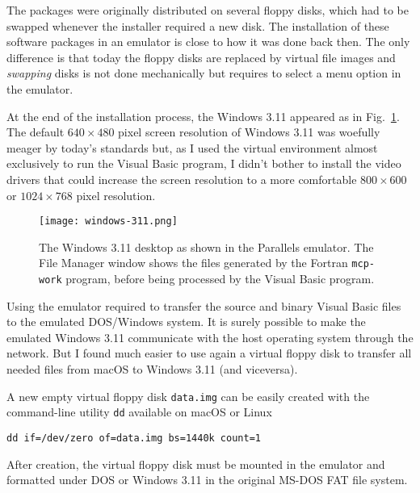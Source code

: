 The packages were originally distributed on several floppy disks, which had to be swapped whenever the installer required a new disk. 
The installation of these software packages in an emulator is close to how it was done back then.
The only difference is that today the floppy disks are replaced by virtual file images and \emph{swapping} disks is not done mechanically but requires to select a menu option in the emulator.

At the end of the installation process, the Windows 3.11 appeared as in Fig.~\ref{fig:windows-311}.
The default $640 \times 480$ pixel screen resolution of Windows 3.11 was woefully meager by today's standards but, as I used the virtual environment almost exclusively to run the Visual Basic program, I didn't bother to install the video drivers that could increase the screen resolution to a more comfortable $800 \times 600$ or $1024 \times 768$ pixel resolution.

\begin{figure}[t]
	\centering
	\texttt{[image: windows-311.png]}
	\caption{The Windows 3.11 desktop as shown in the Parallels emulator. The File Manager window shows the files generated by the Fortran \texttt{mcp-work} program, before being processed by the Visual Basic program.}
	\label{fig:windows-311}
\end{figure}


Using the emulator required to transfer the source and binary Visual Basic files to the emulated DOS/Windows system.
It is surely possible to make the emulated Windows 3.11 communicate with the host operating system through the network. But I found much easier to use again a virtual floppy disk to transfer all needed files from macOS to Windows 3.11 (and viceversa).

A new empty virtual floppy disk \texttt{data.img} can be easily created with the command-line utility \texttt{dd} available on macOS or Linux

\begin{verbatim}
dd if=/dev/zero of=data.img bs=1440k count=1
\end{verbatim}


After creation, the virtual floppy disk must be mounted in the emulator and formatted under DOS or Windows 3.11 in the original MS-DOS FAT file system.

